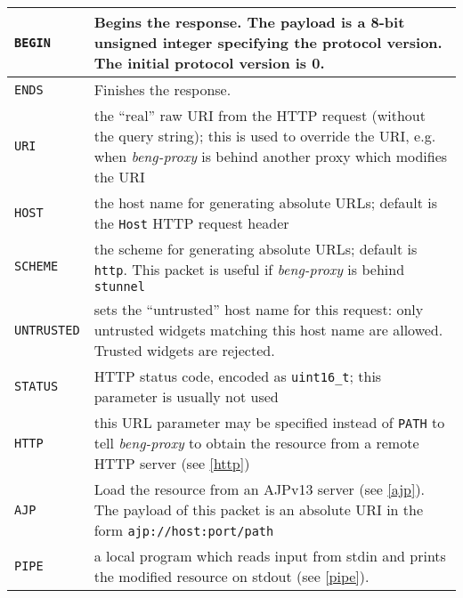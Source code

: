\documentclass[a4paper,12pt]{article}
\begin{document}
\begin{longtable}{|l|p{8cm}|}

\hline

\verb|BEGIN| & Begins the response.  The payload is a 8-bit unsigned
integer specifying the protocol version.  The initial protocol version
is 0. \\

\hline

\verb|ENDS| & Finishes the response. \\

\hline

\verb|URI| & the ``real'' raw URI from the HTTP request (without the
query string); this is used to override the URI, e.g. when
\emph{beng-proxy} is behind another proxy which modifies the URI \\

\hline

\verb|HOST| & the host name for generating absolute URLs; default is
the \texttt{Host} HTTP request header \\

\hline

\verb|SCHEME| & the scheme for generating absolute URLs; default is
\texttt{http}.  This packet is useful if \emph{beng-proxy} is behind
\texttt{stunnel} \\

\hline

\verb|UNTRUSTED| & sets the ``untrusted'' host name for this
request: only untrusted widgets matching this host name are allowed.
Trusted widgets are rejected. \\

\hline
\verb|STATUS| & HTTP status code, encoded as \texttt{uint16\_t};
this parameter is usually not used \\
\hline

\hline

\verb|HTTP| & this URL parameter may be specified instead of
\verb|PATH| to tell \emph{beng-proxy} to obtain the resource from a
remote HTTP server (see \ref{http}) \\

\hline

\verb|AJP| & Load the resource from an AJPv13 server (see
\ref{ajp}).  The payload of this packet is an absolute URI in the form
\texttt{ajp://host:port/path} \\

\hline

\verb|PIPE| & a local program which reads input from stdin and
prints the modified resource on stdout (see \ref{pipe}). \\


\end{longtable}
\end{document}
